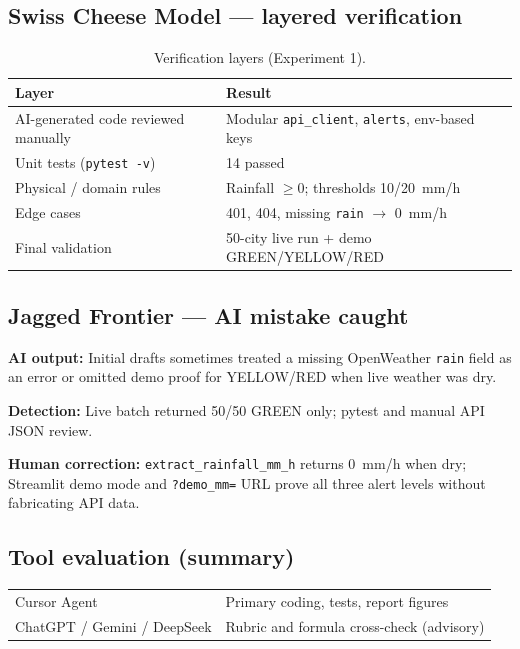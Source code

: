 \documentclass[11pt,a4paper]{article}
\begin{document}
\subsection{Swiss Cheese Model --- layered verification}
\begin{table}[htbp]
  \centering
  \caption{Verification layers (Experiment 1).}
  \label{tab:swiss1}
  \begin{tabular}{@{}ll@{}}
    \toprule
    Layer & Result \\
    \midrule
    AI-generated code reviewed manually & Modular \texttt{api\_client}, \texttt{alerts}, env-based keys \\
    Unit tests (\texttt{pytest -v}) & 14 passed \\
    Physical / domain rules & Rainfall $\ge 0$; thresholds 10/20~mm/h \\
    Edge cases & 401, 404, missing \texttt{rain} $\rightarrow$ 0~mm/h \\
    Final validation & 50-city live run + demo GREEN/YELLOW/RED \\
    \bottomrule
  \end{tabular}
\end{table}

\subsection{Jagged Frontier --- AI mistake caught}
\textbf{AI output:} Initial drafts sometimes treated a missing OpenWeather \texttt{rain} field as an error or omitted demo proof for YELLOW/RED when live weather was dry.

\textbf{Detection:} Live batch returned 50/50 GREEN only; pytest and manual API JSON review.

\textbf{Human correction:} \texttt{extract\_rainfall\_mm\_h} returns 0~mm/h when dry; Streamlit demo mode and \texttt{?demo\_mm=} URL prove all three alert levels without fabricating API data.

\subsection{Tool evaluation (summary)}
\begin{tabular}{@{}ll@{}}
Cursor Agent & Primary coding, tests, report figures \\
ChatGPT / Gemini / DeepSeek & Rubric and formula cross-check (advisory) \\
\end{tabular}
\end{document}
